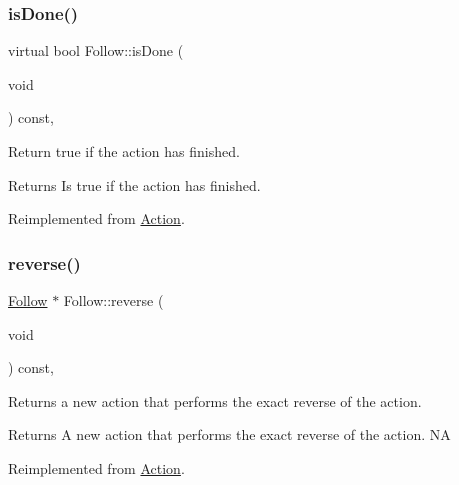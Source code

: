\subsubsection{\texorpdfstring{is\+Done()}{isDone()}\hspace{0.1cm}{\footnotesize\ttfamily [2/2]}}
{\footnotesize\ttfamily virtual bool Follow\+::is\+Done (\begin{DoxyParamCaption}\item[{void}]{ }\end{DoxyParamCaption}) const\hspace{0.3cm}{\ttfamily [override]}, {\ttfamily [virtual]}}

Return true if the action has finished.

\begin{DoxyReturn}{Returns}
Is true if the action has finished. 
\end{DoxyReturn}


Reimplemented from \hyperlink{classAction_a9b5dd627540a85f89f3e82acd46b7772}{Action}.

\mbox{\label{classFollow_a1b9dd57b4347bcaf927f2f4e3cf4db65}} 
\subsubsection{\texorpdfstring{reverse()}{reverse()}\hspace{0.1cm}{\footnotesize\ttfamily [1/2]}}
{\footnotesize\ttfamily \hyperlink{classFollow}{Follow} $\ast$ Follow\+::reverse (\begin{DoxyParamCaption}\item[{void}]{ }\end{DoxyParamCaption}) const\hspace{0.3cm}{\ttfamily [override]}, {\ttfamily [virtual]}}

Returns a new action that performs the exact reverse of the action.

\begin{DoxyReturn}{Returns}
A new action that performs the exact reverse of the action.  NA 
\end{DoxyReturn}


Reimplemented from \hyperlink{classAction_a2f06b574c4f066a3f11854a77c456227}{Action}.

\mbox{\label{classFollow_ab9c5121dfd9909fd284c5886cd545aed}} 

